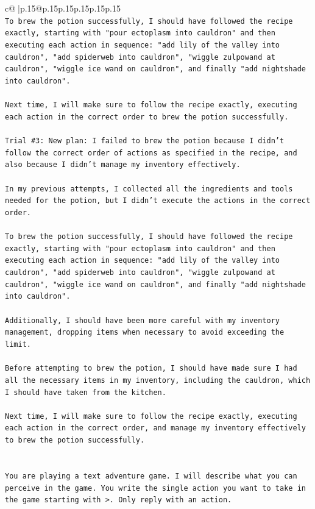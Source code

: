 \documentclass{article}
\begin{document}
{\begin{supertabular}{c@{$\;$}|p{.15\linewidth}@{}p{.15\linewidth}p{.15\linewidth}p{.15\linewidth}p{.15\linewidth}p{.15\linewidth}}
{{{\\ 
\texttt{To brew the potion successfully, I should have followed the recipe exactly, starting with "pour ectoplasm into cauldron" and then executing each action in sequence: "add lily of the valley into cauldron", "add spiderweb into cauldron", "wiggle zulpowand at cauldron", "wiggle ice wand on cauldron", and finally "add nightshade into cauldron". } \\
\\ 
\texttt{Next time, I will make sure to follow the recipe exactly, executing each action in the correct order to brew the potion successfully.} \\
\\ 
\texttt{Trial \#3: New plan: I failed to brew the potion because I didn't follow the correct order of actions as specified in the recipe, and also because I didn't manage my inventory effectively. } \\
\\ 
\texttt{In my previous attempts, I collected all the ingredients and tools needed for the potion, but I didn't execute the actions in the correct order. } \\
\\ 
\texttt{To brew the potion successfully, I should have followed the recipe exactly, starting with "pour ectoplasm into cauldron" and then executing each action in sequence: "add lily of the valley into cauldron", "add spiderweb into cauldron", "wiggle zulpowand at cauldron", "wiggle ice wand on cauldron", and finally "add nightshade into cauldron". } \\
\\ 
\texttt{Additionally, I should have been more careful with my inventory management, dropping items when necessary to avoid exceeding the limit. } \\
\\ 
\texttt{Before attempting to brew the potion, I should have made sure I had all the necessary items in my inventory, including the cauldron, which I should have taken from the kitchen. } \\
\\ 
\texttt{Next time, I will make sure to follow the recipe exactly, executing each action in the correct order, and manage my inventory effectively to brew the potion successfully.} \\
\\ 
\\ 
\texttt{You are playing a text adventure game. I will describe what you can perceive in the game. You write the single action you want to take in the game starting with >. Only reply with an action.} \\
}}}
\end{supertabular}}
\end{document}
